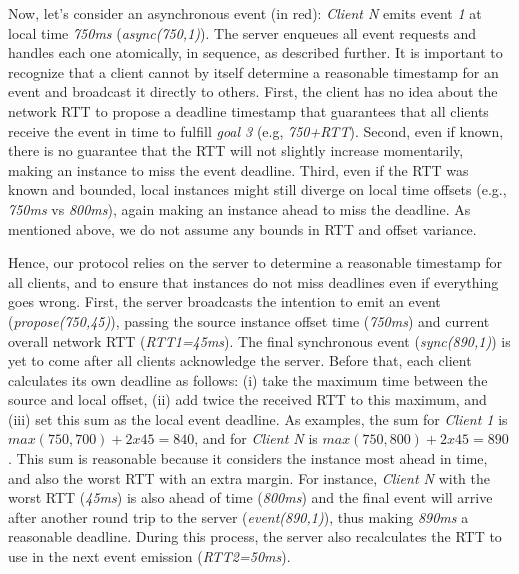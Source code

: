 \documentclass[sigplan,screen]{acmart}
\begin{document}
Now, let's consider an asynchronous event (in red): \emph{Client N} emits event
\emph{1} at local time \emph{750ms} (\emph{async(750,1)}).
The server enqueues all event requests and handles each one atomically, in
sequence, as described further.
%
It is important to recognize that a client cannot by itself determine a
reasonable timestamp for an event and broadcast it directly to others.
First, the client has no idea about the network RTT to propose a deadline
timestamp that guarantees that all clients receive the event in time to fulfill
\emph{goal 3} (e.g, \emph{750+RTT}).
Second, even if known, there is no guarantee that the RTT will not slightly
increase momentarily, making an instance to miss the event deadline.
Third, even if the RTT was known and bounded, local instances might still
diverge on local time offsets (e.g., \emph{750ms} vs \emph{800ms}), again
making an instance ahead to miss the deadline.
%
As mentioned above, we do not assume any bounds in RTT and offset variance.

Hence, our protocol relies on the server to determine a reasonable timestamp
for all clients, and to ensure that instances do not miss deadlines even if
everything goes wrong.
%
First, the server broadcasts the intention to emit an event
(\emph{propose(750,45)}), passing the source instance offset time
(\emph{750ms}) and current overall network RTT (\emph{RTT1=45ms}).
The final synchronous event (\emph{sync(890,1)}) is yet to come after all
clients acknowledge the server.
Before that, each client calculates its own deadline as follows:
    (i) take the maximum time between the source and local offset,
    (ii) add twice the received RTT to this maximum, and
    (iii) set this sum as the local event deadline.
As examples, the sum for
    \emph{Client 1} is $max(750,700)+2x45=840$, and for
    \emph{Client N} is $max(750,800)+2x45=890$.
%
This sum is reasonable because it considers
    the instance most ahead in time, and also
    the worst RTT with an extra margin.
For instance, \emph{Client N} with the worst RTT (\emph{45ms}) is also ahead of
time (\emph{800ms}) and the final event will arrive after another round trip to
the server (\emph{event(890,1)}), thus making \emph{890ms} a reasonable
deadline.
%
During this process, the server also recalculates the RTT to use in the next
event emission (\emph{RTT2=50ms}).
\end{document}
